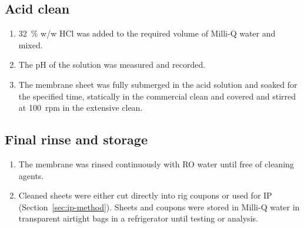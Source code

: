 \subsection*{Acid clean}
\begin{enumerate}
  \item \qty{32}{\percent} w/w HCl was added to the required volume of Milli-Q water and mixed.
  \item The pH of the solution was measured and recorded.
  \item The membrane sheet was fully submerged in the acid solution and soaked for the specified time, statically in the commercial clean and covered and stirred at \qty{100}{rpm} in the extensive clean.
\end{enumerate}

\subsection*{Final rinse and storage}
\begin{enumerate}
  \item The membrane was rinsed continuously with RO water until free of cleaning agents.
  \item Cleaned sheets were either cut directly into rig coupons or used for IP (Section~\ref{sec:ip-method}). Sheets and coupons were stored in Milli-Q water in transparent airtight bags in a refrigerator until testing or analysis.
\end{enumerate}
